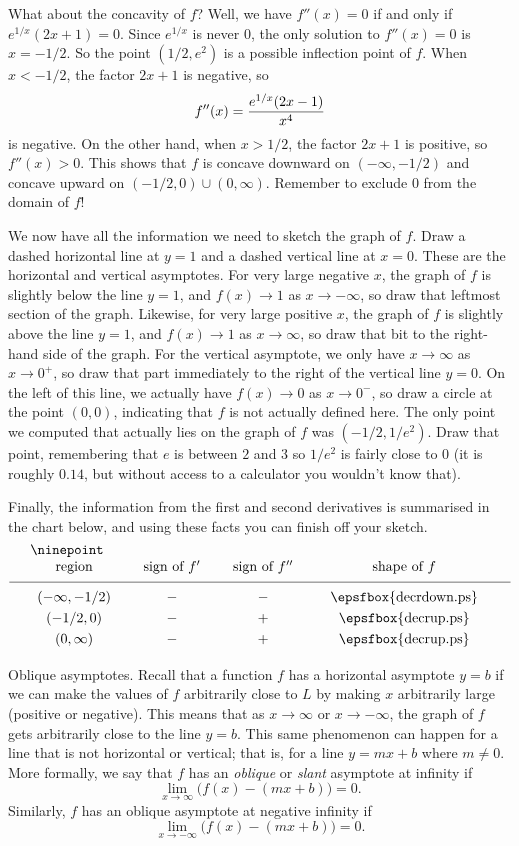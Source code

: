 What about the concavity of $f$? Well, we have $f''(x) = 0$ if and only if $e^{1/x}(2x+1) = 0$.
Since $e^{1/x}$ is never $0$, the only solution to $f''(x) = 0$ is $x=-1/2$. So the point
$(1/2, e^2)$ is a possible inflection point of $f$. When $x<-1/2$, the factor $2x+1$ is negative, so
$$f''(x) = {e^{1/x} (2x-1) \over x^4}$$
is negative. On the other hand, when $x>1/2$, the factor $2x+1$ is positive, so $f''(x) >0$. This shows
that $f$ is concave downward on $(-\infty, -1/2)$ and concave upward on $(-1/2, 0)\cup (0,\infty)$.
Remember to exclude $0$ from the domain of $f$!

We now have all the information we need to sketch the graph of $f$.
Draw a dashed horizontal line at $y=1$ and a dashed vertical line at $x=0$. These are the horizontal
and vertical asymptotes. For very large negative $x$, the graph of $f$ is slightly below the line $y=1$, and
$f(x)\to 1$ as $x\to-\infty$, so draw that leftmost section of the graph. Likewise, for very large positive
$x$, the graph of $f$ is slightly above the line $y=1$, and $f(x)\to 1$ as $x\to \infty$, so draw that bit
to the right-hand side of the graph. For the vertical asymptote, we only have $x\to \infty$ as $x\to 0^+$,
so draw that part immediately to the right of the vertical line $y=0$. On the left of this line, we
actually have $f(x)\to 0$ as $x\to 0^-$, so draw a circle at the point $(0,0)$, indicating that $f$
is not actually defined here.
The only point we computed that actually lies on the graph of $f$ was $(-1/2, 1/e^2)$. Draw that point,
remembering that $e$ is between $2$ and $3$ so $1/e^2$ is fairly close to $0$
(it is roughly $0.14$, but without access to a calculator you wouldn't know that).

Finally, the information from the first and second derivatives
is summarised in the chart below, and using these facts
you can finish off your sketch.
$$
\vbox{\ninepoint
\tabskip=2em plus.2em minus .2em
\halign{
\hfil $#$ \hfil & \hfil#\hfil & \hfil # \hfil  & \hfil#\hfil\cr
\hbox{region} & sign of $f'$  & sign of $f''$ & shape of $f$ \cr
\noalign{\medskip}
\noalign{\hrule}
\noalign{\medskip}
(-\infty, -1/2) & $-$ & $-$ & \epsfbox{decrdown.ps} \cr
\noalign{\smallskip}
(-1/2,0)        & $-$ & $+$ & \epsfbox{decrup.ps} \cr
\noalign{\smallskip}
(0,\infty)      & $-$ & $+$ & \epsfbox{decrup.ps} \cr
}}
$$

\medskip\boldlabel Oblique asymptotes. Recall that a function $f$ has a horizontal asymptote $y=b$ if we can
make the values of $f$ arbitrarily close to $L$ by making $x$ arbitrarily large (positive or negative).
This means that as $x\to \infty$ or $x\to -\infty$, the graph of $f$ gets arbitrarily close to the line
$y=b$. This same phenomenon can happen for a line that is not horizontal or vertical; that is, for a
line $y=mx+b$ where $m\ne 0$. More formally, we say that
$f$ has an {\it oblique} or {\it slant} asymptote at infinity if
$$ \lim_{x\to\infty} \bigl( f(x) - (mx+b)\bigr) = 0.$$
Similarly, $f$ has an oblique asymptote at negative infinity if
$$ \lim_{x\to-\infty} \bigl( f(x) - (mx+b) \bigr)= 0.$$

